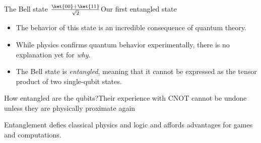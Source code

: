 \begin{frame}{The Bell state $\frac{\ket{00}+\ket{11}}{\sqrt{2}}$}{Our first entangled state}
\Vskip{-3.5em}\begin{itemize}
    \item<1-> The behavior of this state is an incredible consequence of quantum theory.
    \item<2-> While physics confirms quantum behavior experimentally, there is no explanation yet for \emph{why}.
    \item<3-> The Bell state is \emph{entangled}, meaning that it cannot be expressed as the tensor product of two single-qubit states.
\end{itemize}
    
\end{frame}



\begin{frame}{How entangled are the qubits?}{Their experience with CNOT cannot be undone unless they are physically proximate again}

\MedSkip{}
Entanglement defies classical physics and logic and affords advantages for games and computations.
    
\end{frame}

